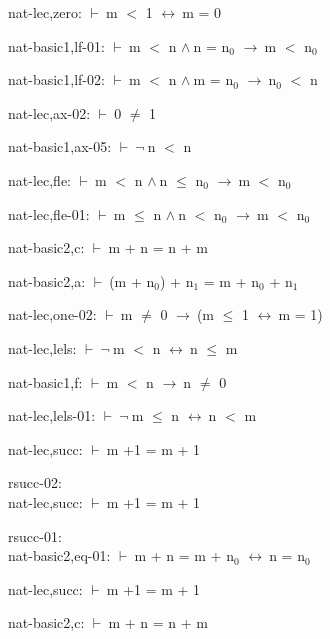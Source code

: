 \documentclass[a4paper]{article}
\newcommand{\Fol}{\mbox{$\vdash\ $}}
\newcommand{\Not}{\mbox{$\neg\ $}}
\newcommand{\And}{\mbox{$\wedge\ $}}
\newcommand{\Imp}{\mbox{$\rightarrow\ $}}
\newcommand{\Equiv}{\mbox{$\leftrightarrow\ $}}
\begin{document}
nat-lec,zero: 
 \Fol m $<$ 1 \Equiv m = 0



nat-basic1,lf-01: 
 \Fol m $<$ n \And n = $\mbox{n}_{0}$ \Imp m $<$ $\mbox{n}_{0}$



nat-basic1,lf-02: 
 \Fol m $<$ n \And m = $\mbox{n}_{0}$ \Imp $\mbox{n}_{0}$ $<$ n



nat-lec,ax-02: 
 \Fol 0 $\neq$ 1



nat-basic1,ax-05: 
 \Fol \Not n $<$ n



nat-lec,fle: 
 \Fol m $<$ n \And n $\le$ $\mbox{n}_{0}$ \Imp m $<$ $\mbox{n}_{0}$



nat-lec,fle-01: 
 \Fol m $\le$ n \And n $<$ $\mbox{n}_{0}$ \Imp m $<$ $\mbox{n}_{0}$



nat-basic2,c: 
 \Fol m + n = n + m



nat-basic2,a: 
 \Fol (m + $\mbox{n}_{0}$) + $\mbox{n}_{1}$ = m + $\mbox{n}_{0}$ + $\mbox{n}_{1}$



nat-lec,one-02: 
 \Fol m $\neq$ 0 \Imp (m $\le$ 1 \Equiv m = 1)



nat-lec,lels: 
 \Fol \Not m $<$ n \Equiv n $\le$ m



nat-basic1,f: 
 \Fol m $<$ n \Imp n $\neq$ 0



nat-lec,lels-01: 
 \Fol \Not m $\le$ n \Equiv n $<$ m



nat-lec,succ: 
 \Fol m +1 = m + 1



\bigskip

rsucc-02:\\ nat-lec,succ: 
 \Fol m +1 = m + 1



\bigskip

rsucc-01:\\ nat-basic2,eq-01: 
 \Fol m + n = m + $\mbox{n}_{0}$ \Equiv n = $\mbox{n}_{0}$



nat-lec,succ: 
 \Fol m +1 = m + 1



nat-basic2,c: 
 \Fol m + n = n + m
\end{document}
